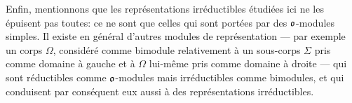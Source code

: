 Enfin, mentionnons que les représentations irréductibles étudiées ici ne les épuisent pas toutes: ce ne sont que celles qui sont portées par des $\mathfrak{o}$-modules simples. Il existe en général d'autres modules de représentation --- par exemple un corps $\Omega$, considéré comme bimodule relativement à un sous-corps $\Sigma$ pris comme domaine à gauche et à $\Omega$ lui-même pris comme domaine à droite --- qui sont réductibles comme $\mathfrak{o}$-modules mais irréductibles comme bimodules, et qui conduisent par conséquent eux aussi à des représentations irréductibles.
